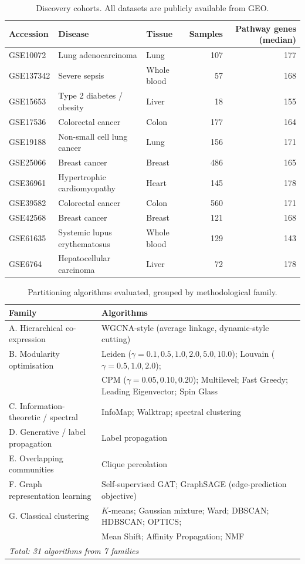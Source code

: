 \documentclass[twocolumn,11pt]{article}
\begin{document}
\begin{table}[t]
\centering
\caption{Discovery cohorts. All datasets are publicly available from GEO.}
\label{tab:datasets}
\small
\begin{tabular}{lllrr}
\toprule
Accession & Disease & Tissue & Samples & Pathway genes (median) \\
\midrule
GSE10072 & Lung adenocarcinoma & Lung & 107 & 177 \\
GSE137342 & Severe sepsis & Whole blood & 57 & 168 \\
GSE15653 & Type 2 diabetes / obesity & Liver & 18 & 155 \\
GSE17536 & Colorectal cancer & Colon & 177 & 164 \\
GSE19188 & Non-small cell lung cancer & Lung & 156 & 171 \\
GSE25066 & Breast cancer & Breast & 486 & 165 \\
GSE36961 & Hypertrophic cardiomyopathy & Heart & 145 & 178 \\
GSE39582 & Colorectal cancer & Colon & 560 & 171 \\
GSE42568 & Breast cancer & Breast & 121 & 168 \\
GSE61635 & Systemic lupus erythematosus & Whole blood & 129 & 143 \\
GSE6764 & Hepatocellular carcinoma & Liver & 72 & 178 \\
\bottomrule
\end{tabular}
\end{table}

\begin{table}[t]
\centering
\caption{Partitioning algorithms evaluated, grouped by methodological family.}
\label{tab:algos}
\small
\begin{tabular}{ll}
\toprule
Family & Algorithms \\
\midrule
A. Hierarchical co-expression & WGCNA-style (average linkage, dynamic-style cutting) \\
B. Modularity optimisation & Leiden ($\gamma=0.1,0.5,1.0,2.0,5.0,10.0$); Louvain ($\gamma=0.5,1.0,2.0$); \\
 & CPM ($\gamma=0.05,0.10,0.20$); Multilevel; Fast Greedy; Leading Eigenvector; Spin Glass \\
C. Information-theoretic / spectral & InfoMap; Walktrap; spectral clustering \\
D. Generative / label propagation & Label propagation \\
E. Overlapping communities & Clique percolation \\
F. Graph representation learning & Self-supervised GAT; GraphSAGE (edge-prediction objective) \\
G. Classical clustering & $K$-means; Gaussian mixture; Ward; DBSCAN; HDBSCAN; OPTICS; \\
 & Mean Shift; Affinity Propagation; NMF \\
\midrule
\multicolumn{2}{l}{\emph{Total: 31 algorithms from 7 families}} \\
\bottomrule
\end{tabular}
\end{table}
\end{document}
